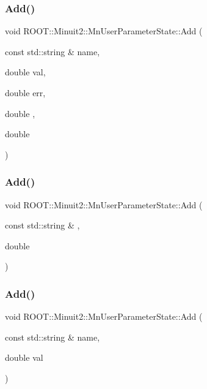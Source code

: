 \subsubsection{\texorpdfstring{Add()}{Add()}\hspace{0.1cm}{\footnotesize\ttfamily [6/9]}}
{\footnotesize\ttfamily void R\+O\+O\+T\+::\+Minuit2\+::\+Mn\+User\+Parameter\+State\+::\+Add (\begin{DoxyParamCaption}\item[{const std\+::string \&}]{name,  }\item[{double}]{val,  }\item[{double}]{err,  }\item[{double}]{,  }\item[{double}]{ }\end{DoxyParamCaption})}

\mbox{\label{classROOT_1_1Minuit2_1_1MnUserParameterState_a553bf18d39208bf83a8d7898176b20e6}} 
\subsubsection{\texorpdfstring{Add()}{Add()}\hspace{0.1cm}{\footnotesize\ttfamily [7/9]}}
{\footnotesize\ttfamily void R\+O\+O\+T\+::\+Minuit2\+::\+Mn\+User\+Parameter\+State\+::\+Add (\begin{DoxyParamCaption}\item[{const std\+::string \&}]{,  }\item[{double}]{ }\end{DoxyParamCaption})}

\mbox{\label{classROOT_1_1Minuit2_1_1MnUserParameterState_a553bf18d39208bf83a8d7898176b20e6}} 
\subsubsection{\texorpdfstring{Add()}{Add()}\hspace{0.1cm}{\footnotesize\ttfamily [8/9]}}
{\footnotesize\ttfamily void R\+O\+O\+T\+::\+Minuit2\+::\+Mn\+User\+Parameter\+State\+::\+Add (\begin{DoxyParamCaption}\item[{const std\+::string \&}]{name,  }\item[{double}]{val }\end{DoxyParamCaption})}

